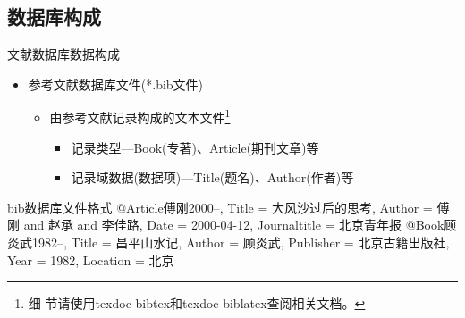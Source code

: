 \documentclass[fontset = none, t]{ctexbeamer}
\begin{document}
\subsection[数据库构成]{数据库构成}
\begin{frame}[fragile]{文献数据库}{数据构成}
  \begin{spacing}{1.0}
    \begin{itemize}
    \item 参考文献数据库文件(\alert{*.bib}文件)
      \begin{itemize}
      \item 由参考文献记录构成的\alert{文本文件}\footnote[frame,2]{细
          节请使用texdoc bibtex和texdoc biblatex查阅相关文档。}
        \begin{itemize}
        \item 记录类型---Book(专著)、Article(期刊文章)等
        \item 记录域数据(数据项)---Title(题名)、Author(作者)等
        \end{itemize}
      \end{itemize}
    \end{itemize}
  \end{spacing}
  \vspace{-0.8ex}
  \begin{center}
    \begin{minipage}[h]{0.55\linewidth}
    \begin{textcb}{bib数据库文件格式}
      @Article{傅刚2000--,
        Title = {大风沙过后的思考},
        Author = {傅刚 and 赵承 and 李佳路},
        Date = {2000-04-12},
        Journaltitle = {北京青年报}
      }
      @Book{顾炎武1982--,
        Title = {昌平山水记},
        Author = {顾炎武},
        Publisher = {北京古籍出版社},
        Year = {1982},
        Location = {北京}
      }
    \end{textcb}
    \end{minipage}
  \end{center}
\end{frame}
\end{document}
